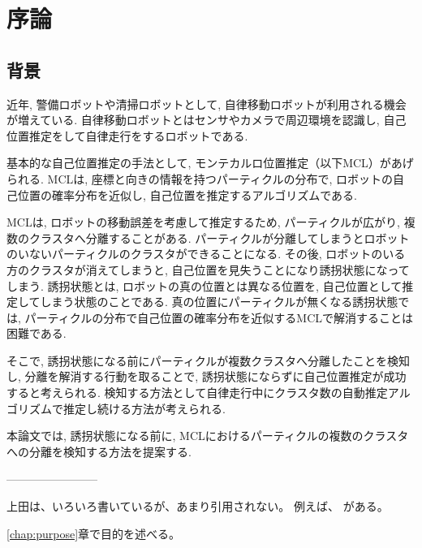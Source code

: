 \chapter{序論}
\section{背景}
近年, 警備ロボットや清掃ロボットとして, 自律移動ロボットが利用される機会が増えている. 
自律移動ロボットとはセンサやカメラで周辺環境を認識し, 自己位置推定をして自律走行をするロボットである. 

基本的な自己位置推定の手法として, モンテカルロ位置推定（以下MCL）があげられる. 
MCLは, 座標と向きの情報を持つパーティクルの分布で, ロボットの自己位置の確率分布を近似し, 自己位置を推定するアルゴリズムである.

MCLは, ロボットの移動誤差を考慮して推定するため, パーティクルが広がり, 複数のクラスタへ分離することがある. 
パーティクルが分離してしまうとロボットのいないパーティクルのクラスタができることになる. 
その後, ロボットのいる方のクラスタが消えてしまうと, 自己位置を見失うことになり誘拐状態になってしまう. 
誘拐状態とは, ロボットの真の位置とは異なる位置を, 自己位置として推定してしまう状態のことである.
真の位置にパーティクルが無くなる誘拐状態では, パーティクルの分布で自己位置の確率分布を近似するMCLで解消することは困難である. 


そこで, 誘拐状態になる前にパーティクルが複数クラスタへ分離したことを検知し, 分離を解消する行動を取ることで, 誘拐状態にならずに自己位置推定が成功すると考えられる. 
検知する方法として自律走行中にクラスタ数の自動推定アルゴリズムで推定し続ける方法が考えられる. 

本論文では, 誘拐状態になる前に, MCLにおけるパーティクルの複数のクラスタへの分離を検知する方法を提案する. 









------------------------


上田は、いろいろ書いているが、あまり引用されない。
例えば、\cite{上田2015gihyo,ueda2015,上田2015jsai}
がある。

\ref{chap:purpose}章で目的を述べる。

%
